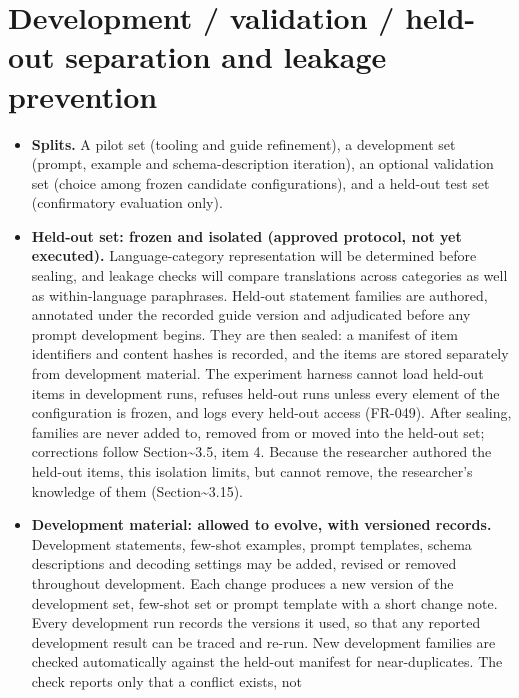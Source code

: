 \documentclass[
  11pt,a4paper,oneside]{report}
\providecommand{\tightlist}{%
  \setlength{\itemsep}{0pt}\setlength{\parskip}{0pt}}
\begin{document}
\hypertarget{development--validation--held-out-separation-and-leakage-prevention}{%
\section{Development / validation / held-out separation and leakage
prevention}\label{development--validation--held-out-separation-and-leakage-prevention}}

\begin{itemize}
\tightlist
\item
  \textbf{Splits.} A pilot set (tooling and guide refinement), a
  development set (prompt, example and schema-description iteration), an
  optional validation set (choice among frozen candidate configurations),
  and a held-out test set (confirmatory evaluation only).
\item
  \textbf{Held-out set: frozen and isolated (approved protocol, not yet executed).} Language-category representation will be determined before sealing, and leakage checks will compare translations across categories as well as within-language paraphrases. Held-out statement families
  are authored, annotated under the recorded guide version and adjudicated
  before any prompt development begins. They are then sealed: a manifest
  of item identifiers and content hashes is recorded, and the items are
  stored separately from development material. The experiment harness
  cannot load held-out items in development runs, refuses held-out runs
  unless every element of the configuration is frozen, and logs every
  held-out access (FR-049). After sealing, families are never added to,
  removed from or moved into the held-out set; corrections follow
  Section\textasciitilde3.5, item 4. Because the researcher authored the
  held-out items, this isolation limits, but cannot remove, the
  researcher's knowledge of them (Section\textasciitilde3.15).
\item
  \textbf{Development material: allowed to evolve, with versioned
  records.} Development statements, few-shot examples, prompt templates,
  schema descriptions and decoding settings may be added, revised or
  removed throughout development. Each change produces a new version of
  the development set, few-shot set or prompt template with a short change
  note. Every development run records the versions it used, so that any
  reported development result can be traced and re-run. New development
  families are checked automatically against the held-out manifest for
  near-duplicates. The check reports only that a conflict exists, not

\end{itemize}
\end{document}
